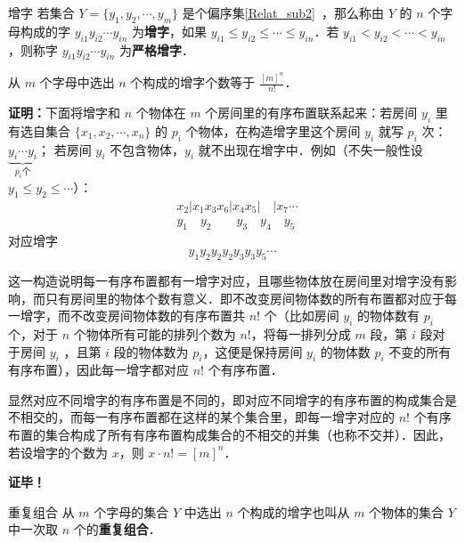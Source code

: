 \begin{definition}{增字}
若集合 $Y=\{y_1,y_2,\cdots,y_m\}$ 是个偏序集\autoref{Relat_sub2}~，那么称由 $Y$ 的 $n$ 个字母构成的字 $y_{i1}y_{i2}\cdots y_{in}$ 为\textbf{增字}，如果 $y_{i1}\leq y_{i2}\leq\cdots\leq y_{in}$．若 $y_{i1}<y_{i2}<\cdots<y_{in}$，则称字 $y_{i1}y_{i2}\cdots y_{in}$ 为\textbf{严格增字}．
\end{definition}
\begin{theorem}{}\label{APC_the4}
从 $m$ 个字母中选出 $n$ 个构成的增字个数等于 $\frac{[m]^n}{n!}$．
\end{theorem}
\textbf{证明：}下面将增字和 $n$ 个物体在 $m$ 个房间里的有序布置联系起来：若房间 $y_i$ 里有选自集合 $\{x_1,x_2,\cdots,x_n\}$ 的 $p_i$ 个物体，在构造增字里这个房间 $y_i$ 就写 $p_i$ 次：$\underbrace{y_i\cdots y_i}_{p_i\text{个}}$；
若房间 $y_i$ 不包含物体，$y_i$ 就不出现在增字中．例如（不失一般性设 $y_1\leq y_2\leq\cdots$）：
\begin{equation}
\begin{aligned}
&x_2| x_1 x_3 x_6|x_4 x_5|\quad|x_7\cdots\\
&y_1\quad y_2\qquad y_3\quad y_4\quad y_5
\end{aligned}
\end{equation}
对应增字
\begin{equation}
y_1y_2y_2y_2y_3y_3y_5\cdots
\end{equation}

这一构造说明每一有序布置都有一增字对应，且哪些物体放在房间里对增字没有影响，而只有房间里的物体个数有意义．即不改变房间物体数的所有布置都对应于每一增字，而不改变房间物体数的有序布置共 $n!$ 个（比如房间 $y_i$ 的物体数有 $p_i$ 个，对于 $n$ 个物体所有可能的排列个数为 $n!$，将每一排列分成 $m$ 段，第 $i$ 段对于房间 $y_i$ ，且第 $i$ 段的物体数为 $p_i$，这便是保持房间 $y_i$ 的物体数 $p_i$ 不变的所有有序布置），因此每一增字都对应 $n!$ 个有序布置．

显然对应不同增字的有序布置是不同的，即对应不同增字的有序布置的构成集合是不相交的，而每一有序布置都在这样的某个集合里，即每一增字对应的 $n!$ 个有序布置的集合构成了所有有序布置构成集合的不相交的并集（也称不交并）．因此，若设增字的个数为 $x$，则 $x\cdot n!=[m]^n$．

\textbf{证毕！}

\begin{definition}{重复组合}
从 $m$ 个字母的集合 $Y$ 中选出 $n$ 个构成的增字也叫从 $m$ 个物体的集合 $Y$ 中一次取 $n$ 个的\textbf{重复组合}．
\end{definition}

